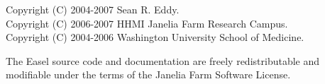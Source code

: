 \vspace*{\fill}
\begin{flushleft}
Copyright (C) 2004-2007 Sean R. Eddy.\\
Copyright (C) 2006-2007 HHMI Janelia Farm Research Campus.\\
Copyright (C) 2004-2006 Washington University School of Medicine.\\
\end{flushleft}

\vspace{2em} 

The Easel source code and documentation are freely redistributable and
modifiable under the terms of the Janelia Farm Software License.


